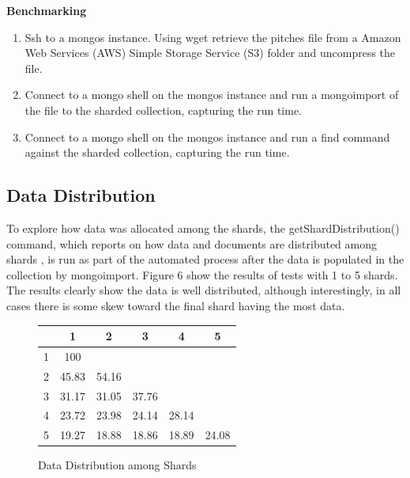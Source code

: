 \documentclass[9pt,twocolumn,twoside]{../../styles/osajnl}
\begin{document}
\textbf{Benchmarking}


\begin{enumerate}
\item Ssh to a mongos instance.  Using wget retrieve the pitches file from a Amazon Web Services (AWS) Simple Storage Service (S3) folder and uncompress the file.
\item Connect to a mongo shell on the mongos instance and run a mongoimport of the file to the sharded collection, capturing the run time.
\item Connect to a mongo shell on the mongos instance and run a find command against the sharded collection, capturing the run time. 
\end{enumerate}


\subsection{Data Distribution}

To explore how data was allocated among the shards, the getShardDistribution() command, which reports on how data and documents are distributed among shards \cite{www-shardDist}, is run as part of the automated process after the data is populated in the collection by mongoimport.  Figure 6 show the results of tests with 1 to 5 shards.  The results clearly show the data is well distributed, although interestingly, in all cases there is some skew toward the final shard having the most data.


\begin{figure}[ht]
\begin{center}
 \begin{tabular}{| c | c | c | c | c | c |} 
 \hline
  &  1    &  2    &  3    &   4   & 5 \\ [0.5ex]
\hline
  \hline
1 & 100   &       &       &       &   \\
\hline
2 & 45.83 & 54.16 &       &       &   \\
\hline
3 & 31.17 & 31.05 & 37.76 &       &   \\
\hline
4 & 23.72 & 23.98 & 24.14 & 28.14 &   \\
\hline
5 & 19.27 & 18.88 & 18.86 & 18.89 & 24.08   \\
\hline
\end{tabular}
\end{center}
  \caption{Data Distribution among Shards}
\end{figure}
\end{document}
